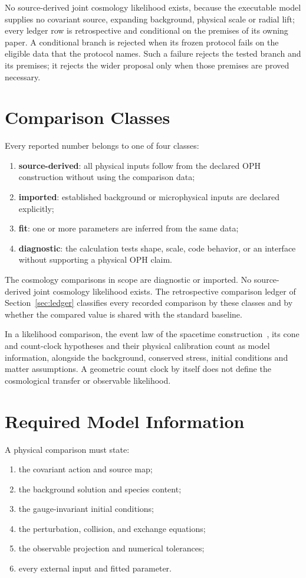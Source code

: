\documentclass[11pt]{article}
\begin{document}
No source-derived joint cosmology likelihood exists, because the executable
model supplies no covariant source, expanding background, physical scale or
radial lift; every ledger row is retrospective and conditional on the
premises of its owning paper. A conditional branch is rejected when its
frozen protocol fails on the eligible data that the protocol names. Such a
failure rejects the tested branch and its premises; it rejects the wider
proposal only when those premises are proved necessary.

\section{Comparison Classes}

Every reported number belongs to one of four classes:
\begin{enumerate}[leftmargin=2em]
\item \textbf{source-derived}: all physical inputs follow from the declared OPH
construction without using the comparison data;
\item \textbf{imported}: established background or microphysical inputs are
declared explicitly;
\item \textbf{fit}: one or more parameters are inferred from the same data;
\item \textbf{diagnostic}: the calculation tests shape, scale, code behavior, or
an interface without supporting a physical OPH claim.
\end{enumerate}

The cosmology comparisons in scope are diagnostic or imported. No source-derived
joint cosmology likelihood exists. The retrospective comparison ledger of
Section~\ref{sec:ledger} classifies every recorded comparison by these
classes and by whether the compared value is shared with the standard
baseline.

In a likelihood comparison, the event law of the spacetime
construction~\cite{ophEinstein}, its cone and count-clock hypotheses and
their physical calibration count as model information, alongside the
background, conserved stress, initial conditions and matter assumptions. A
geometric count clock by itself does not define the cosmological transfer or
observable likelihood.

\section{Required Model Information}

A physical comparison must state:
\begin{enumerate}[leftmargin=2em]
\item the covariant action and source map;
\item the background solution and species content;
\item the gauge-invariant initial conditions;
\item the perturbation, collision, and exchange equations;
\item the observable projection and numerical tolerances;
\item every external input and fitted parameter.
\end{enumerate}
\end{document}
